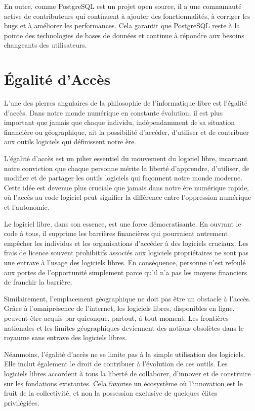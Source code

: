 En outre, comme PostgreSQL est un projet open source, il a une communauté active de contributeurs qui continuent à ajouter des fonctionnalités, à corriger les bugs et à améliorer les performances. Cela garantit que PostgreSQL reste à la pointe des technologies de bases de données et continue à répondre aux besoins changeants des utilisateurs. \cite{PostgreSQL}

\section{Égalité d'Accès}
L'une des pierres angulaires de la philosophie de l'informatique libre est l'égalité d'accès. Dans notre monde numérique en constante évolution, il est plus important que jamais que chaque individu, indépendamment de sa situation financière ou géographique, ait la possibilité d'accéder, d'utiliser et de contribuer aux outils logiciels qui définissent notre ère.

L'égalité d'accès est un pilier essentiel du mouvement du logiciel libre, incarnant notre conviction que chaque personne mérite la liberté d'apprendre, d'utiliser, de modifier et de partager les outils logiciels qui façonnent notre monde moderne. Cette idée est devenue plus cruciale que jamais dans notre ère numérique rapide, où l'accès au code logiciel peut signifier la différence entre l'oppression numérique et l'autonomie.

Le logiciel libre, dans son essence, est une force démocratisante. En ouvrant le code à tous, il supprime les barrières financières qui pourraient autrement empêcher les individus et les organisations d'accéder à des logiciels cruciaux. Les frais de licence souvent prohibitifs associés aux logiciels propriétaires ne sont pas une entrave à l'usage des logiciels libres. En conséquence, personne n'est refoulé aux portes de l'opportunité simplement parce qu'il n'a pas les moyens financiers de franchir la barrière.

Similairement, l'emplacement géographique ne doit pas être un obstacle à l'accès. Grâce à l'omniprésence de l'internet, les logiciels libres, disponibles en ligne, peuvent être acquis par quiconque, partout, à tout moment. Les frontières nationales et les limites géographiques deviennent des notions obsolètes dans le royaume sans entrave des logiciels libres.

Néanmoins, l'égalité d'accès ne se limite pas à la simple utilisation des logiciels. Elle inclut également le droit de contribuer à l'évolution de ces outils. Les logiciels libres accordent à tous la liberté de collaborer, d'innover et de construire sur les fondations existantes. Cela favorise un écosystème où l'innovation est le fruit de la collectivité, et non la possession exclusive de quelques élites privilégiées.

